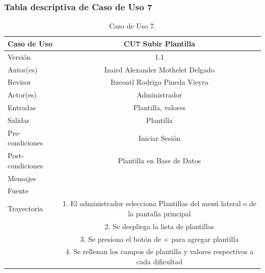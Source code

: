 \documentclass{article}
\begin{document}
\subsubsection{Tabla descriptiva de Caso de Uso 7}
\begin{table}[H]
\caption{Caso de Uso 7.}
\begin{tabular}{|M{5cm}|c|}

\hline
Caso de Uso & CU7 Subir Plantilla\\ \hline
Versión & 1.1\\ \hline
Autor(es) & Izaird Alexander Mothelet Delgado\\ \hline
Revisor &  Itzcoatl Rodrigo Pineda Vieyra \\ \hline
Actor(es) & Administrador \\ \hline
Entradas &  Plantilla, valores \\ \hline
Salidas & Plantilla \\ \hline
Pre-condiciones & Iniciar Sesión \\ \hline
Post-condiciones & Plantilla en Base de Datos\\ \hline
Mensajes & \\
Fuente &  \\ \hline	
	Trayectoria
		& 1. El administrador selecciona Plantillas del menú lateral o de la pantalla principal \\
		& 2. Se despliega la lista de plantillas\\ 
		& 3. Se presiona el botón de + para agregar plantilla\\
		& 4. Se rellenan los campos de plantilla y valores respectivos a  cada dificultad \\		
		\hline
		
\end{tabular}
\end{table}
\end{document}
